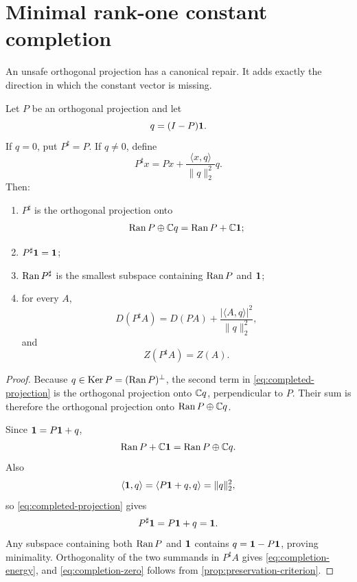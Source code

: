 \section{Minimal rank-one constant completion}
\label{sec:constant-completion}

An unsafe orthogonal projection has a canonical repair.  It adds
exactly the direction in which the constant vector is missing.

\begin{theorem}
\label{thm:minimal-completion}
Let \(P\) be an orthogonal projection and let
\[
 q=(I-P)\mathbf 1.
\]
If \(q=0\), put \(P^\sharp=P\).  If \(q\ne0\), define
\begin{equation}
 P^\sharp x
 =
 Px+
 \frac{\langle x,q\rangle}{\|q\|_2^2}q.
\label{eq:completed-projection}
\end{equation}
Then:
\begin{enumerate}[label=(\roman*),leftmargin=2.2em]
\item \(P^\sharp\) is the orthogonal projection onto
  \[
  \operatorname{Ran} P\oplus\mathbb C q
  =
  \operatorname{Ran} P+\mathbb C\mathbf 1;
  \]
\item \(P^\sharp\mathbf 1=\mathbf 1\);
\item \(\operatorname{Ran} P^\sharp\) is the smallest subspace containing
  \(\operatorname{Ran} P\) and \(\mathbf 1\);
\item for every \(A\),
  \begin{equation}
  D(P^\sharp A)
  =
  D(PA)+
  \frac{|\langle A,q\rangle|^2}{\|q\|_2^2},
  \label{eq:completion-energy}
  \end{equation}
  and
  \begin{equation}
  Z(P^\sharp A)=Z(A).
  \label{eq:completion-zero}
  \end{equation}
\end{enumerate}
\end{theorem}

\begin{proof}
Because \(q\in\operatorname{Ker} P=(\operatorname{Ran} P)^\perp\), the second term in
\eqref{eq:completed-projection} is the orthogonal projection onto
\(\mathbb C q\), perpendicular to \(P\).  Their sum is therefore the
orthogonal projection onto \(\operatorname{Ran} P\oplus\mathbb C q\).

Since \(\mathbf 1=P\mathbf 1+q\),
\[
 \operatorname{Ran} P+\mathbb C\mathbf 1
 =
 \operatorname{Ran} P\oplus\mathbb C q.
\]
Also
\[
 \langle\mathbf 1,q\rangle
 =
 \langle P\mathbf 1+q,q\rangle
 =
 \|q\|_2^2,
\]
so \eqref{eq:completed-projection} gives
\[
 P^\sharp\mathbf 1=P\mathbf 1+q=\mathbf 1.
\]
Any subspace containing both \(\operatorname{Ran} P\) and \(\mathbf 1\) contains
\(q=\mathbf 1-P\mathbf 1\), proving minimality.  Orthogonality of the two
summands in \(P^\sharp A\) gives
\eqref{eq:completion-energy}, and
\eqref{eq:completion-zero} follows from
\cref{prop:preservation-criterion}.
\end{proof}

